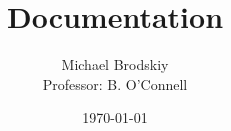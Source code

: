 


\title{Documentation}
\date{\today}
\author{Michael Brodskiy\\ \small Professor: B. O'Connell}



\maketitle

